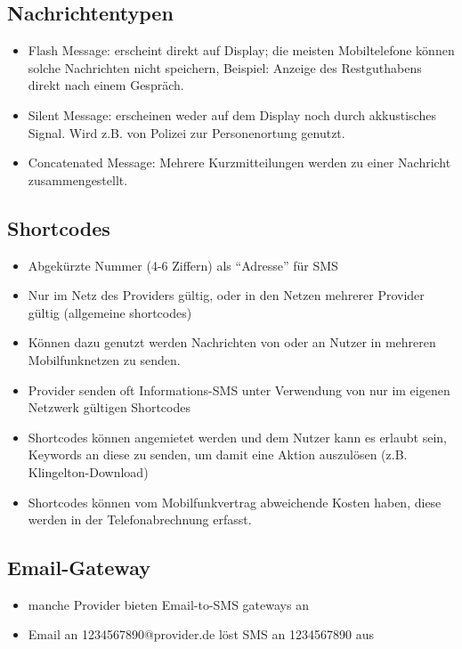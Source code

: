 \documentclass[german,12pt,a4paper]{article}
\begin{document}
\subsection{Nachrichtentypen}
\begin{itemize}
	\item Flash Message: erscheint direkt auf Display; die meisten Mobiltelefone können solche Nachrichten nicht speichern,
		Beispiel: Anzeige des Restguthabens direkt nach einem Gespräch.
	\item Silent Message: erscheinen weder auf dem Display noch durch akkustisches Signal. 
		Wird z.B. von Polizei zur Personenortung genutzt.
	\item Concatenated Message: Mehrere Kurzmitteilungen werden zu einer Nachricht zusammengestellt.
\end{itemize}

\subsection{Shortcodes}
\begin{itemize}
	\item Abgekürzte Nummer (4-6 Ziffern) als ``Adresse'' für SMS
	\item Nur im Netz des Providers gültig, oder in den Netzen mehrerer Provider gültig (allgemeine shortcodes)
	\item Können dazu genutzt werden Nachrichten von oder an Nutzer in mehreren Mobilfunknetzen zu senden.
	\item Provider senden oft Informations-SMS unter Verwendung von nur im eigenen Netzwerk gültigen Shortcodes
	\item Shortcodes können angemietet werden und dem Nutzer kann es erlaubt sein, Keywords an diese zu senden, um 
		damit eine Aktion auszulösen (z.B. Klingelton-Download)
	\item Shortcodes können vom Mobilfunkvertrag abweichende Kosten haben, diese werden in der Telefonabrechnung 
		erfasst.
\end{itemize}

\subsection{Email-Gateway}
\begin{itemize}
	\item manche Provider bieten Email-to-SMS gateways an
	\item Email an 1234567890@provider.de löst SMS an 1234567890 aus
\end{itemize}
\end{document}
